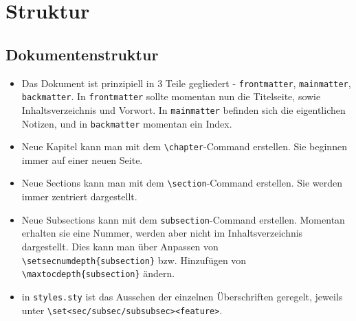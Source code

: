 \documentclass[11pt,twoside]{memoir}
\begin{document}
	
\frontmatter
\maketitle
\tableofcontents

\mainmatter
\chapter{Struktur}
\section{Dokumentenstruktur}
\begin{itemize}
\item Das Dokument ist prinzipiell in 3 Teile gegliedert - \verb|frontmatter|, \verb|mainmatter|, \verb|backmatter|. In \verb|frontmatter| sollte momentan nun die Titelseite, sowie Inhaltsverzeichnis und Vorwort. In \verb|mainmatter| befinden sich die eigentlichen Notizen, und in \verb|backmatter| momentan ein Index.
\item Neue Kapitel kann man mit dem \verb|\chapter|-Command erstellen. Sie beginnen immer auf einer neuen Seite.
\item Neue Sections kann man mit dem \verb|\section|-Command erstellen. Sie werden immer zentriert dargestellt.
\item Neue Subsections kann mit dem \verb|subsection|-Command erstellen. Momentan erhalten sie eine Nummer, werden aber nicht im Inhaltsverzeichnis dargestellt. Dies kann man über Anpassen von \verb|\setsecnumdepth{subsection}| bzw. Hinzufügen von \verb|\maxtocdepth{subsection}| ändern.
\item in \verb|styles.sty| ist das Aussehen der einzelnen Überschriften geregelt, jeweils unter \verb|\set<sec/subsec/subsubsec><feature>|.
\end{itemize}



\backmatter
\printindex
\end{document}
